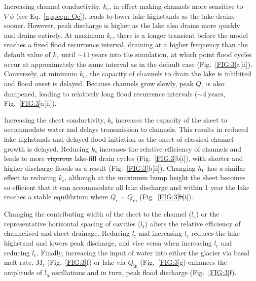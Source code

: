\documentclass[tc, manuscript]{copernicus}
\providecommand{\DIFadd}[1]{{\protect\color{blue}\uwave{#1}}} %
\providecommand{\DIFdel}[1]{{\protect\color{red}\sout{#1}}} %
\providecommand{\DIFaddbegin}{} %
\providecommand{\DIFaddend}{} %
\providecommand{\DIFdelbegin}{} %
\providecommand{\DIFdelend}{} %
\begin{document}
Increasing channel conductivity, $k_{\mathrm{c}}$, in effect making channels more sensitive to $\nabla \phi$ (see Eq.~\ref{appeqn: Qc}), leads to lower lake highstands as the lake drains sooner. However, peak discharge is higher as the lake also drains more quickly and drains entirely. At maximum $k_{\mathrm{c}}$, there is a longer transient before the model reaches a fixed flood recurrence interval, draining at a higher frequency than the default value of $k_{\mathrm{c}}$ until $\sim 11 \ \mathrm{years}$ into the simulation, at which point flood cycles occur at approximately the same interval as in the default case (Fig.~\ref{FIG:3}a[ii]). Conversely, at minimum $k_{\mathrm{c}}$, the capacity of channels to drain the lake is inhibited and flood onset is delayed. Because channels grow slowly, peak $Q_{\mathrm{r}}$ is also dampened, leading to relatively long flood recurrence intervals ($\sim 4\ \mathrm{years}$, Fig.~\ref{FIG:3}a[ii]).

Increasing the sheet conductivity, $k_{\mathrm{s}}$ increases the capacity of the sheet to accommodate water and delays transmission to channels. This results in reduced lake highstands and delayed flood initiation as the onset of classical channel growth is delayed. Reducing $k_{\mathrm{s}}$ increases the relative efficiency of channels and leads to more \DIFdelbegin \DIFdel{vigorous }\DIFdelend \DIFaddbegin \DIFadd{higher amplitude }\DIFaddend lake-fill drain cycles (Fig.~\ref{FIG:3}b[i]), with shorter and higher discharge floods as a result (Fig.~\ref{FIG:3}b[ii]). Changing $h_{\mathrm{b}}$ has a similar effect to reducing $k_{\mathrm{s}}$, although at the maximum bump height the sheet becomes so efficient that it can accommodate all lake discharge and within 1 year the lake reaches a stable equilibrium where $Q_{\mathrm{r}} = Q_{\mathrm{in}}$ (Fig.~\ref{FIG:3}\DIFdelbegin \DIFdel{b}\DIFdelend \DIFaddbegin \DIFadd{c}\DIFaddend [i]). 

Changing the contributing width of the sheet to the channel ($l_{\mathrm{c}}$) or the representative horizontal spacing of cavities ($l_{\mathrm{r}}$) alters the relative efficiency of channelised and sheet drainage. Reducing $l_{\mathrm{r}}$ and increasing $l_{\mathrm{c}}$ reduces the lake highstand and lowers peak discharge, and vice versa when increasing $l_{\mathrm{r}}$ and reducing $l_{\mathrm{c}}$. Finally, increasing the input of water into either the glacier via basal melt rate, $M_{\mathrm{r}}$ (Fig.~\ref{FIG:3}f) or lake via $Q_{\mathrm{in}}$ (Fig.~\ref{FIG:3}g) enhances the amplitude of $l_{\mathrm{h}}$ oscillations and in turn, peak flood discharge (Fig.~\ref{FIG:3}f). 
\end{document}
